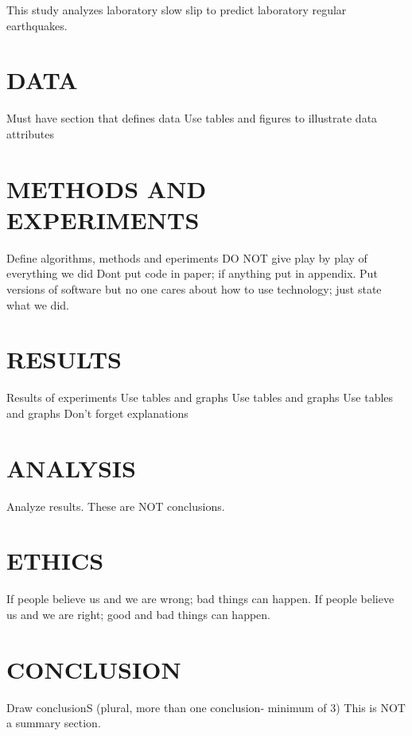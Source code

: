 \documentclass[]{llncs}
\begin{document}
This study analyzes laboratory slow slip to predict laboratory regular earthquakes.

\section{DATA}
Must have section that defines data
Use tables and figures to illustrate data attributes
\section{METHODS AND EXPERIMENTS}
Define algorithms, methods and eperiments
DO NOT give play by play of everything we did
Dont put code in paper; if anything put in appendix.
Put versions of software but no one cares about how to use technology; just state what we did.
\section{RESULTS}
Results of experiments
Use tables and graphs
Use tables and graphs
Use tables and graphs
Don't forget explanations
\section{ANALYSIS}
Analyze results.
These are NOT conclusions.
\section{ETHICS}
If people believe us and we are wrong; bad things can happen. If people believe us and we are right; good and bad things can happen.
\section{CONCLUSION}
Draw conclusionS (plural, more than one conclusion- minimum of 3)
This is NOT a summary section.


\end{document}
